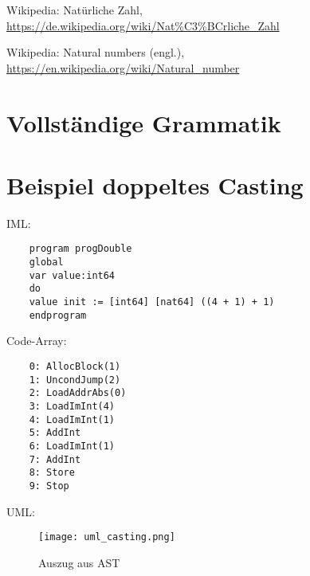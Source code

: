 \documentclass[10pt, a4paper, twocolumn]{article} %
\begin{document}
\begin{thebibliography}{9}
    Wikipedia: Natürliche Zahl,
    \url{https://de.wikipedia.org/wiki/Nat\%C3\%BCrliche_Zahl}

    Wikipedia: Natural numbers (engl.),
    \url{https://en.wikipedia.org/wiki/Natural_number}
\end{thebibliography}

\clearpage
\appendix
\section{Vollständige Grammatik}

\clearpage
\section{Beispiel doppeltes Casting}
\label{bsp_casting}
IML:
\begin{lstlisting}
    program progDouble
    global
    var value:int64
    do
    value init := [int64] [nat64] ((4 + 1) + 1)
    endprogram
\end{lstlisting}

Code-Array:
\begin{lstlisting}
    0: AllocBlock(1)
    1: UncondJump(2)
    2: LoadAddrAbs(0)
    3: LoadImInt(4)
    4: LoadImInt(1)
    5: AddInt
    6: LoadImInt(1)
    7: AddInt
    8: Store
    9: Stop
\end{lstlisting}

UML:
\begin{figure}[H]
    \texttt{[image: uml\_casting.png]} %
    \caption{Auszug aus AST } %
    \label{casting}
\end{figure}


\end{document}
